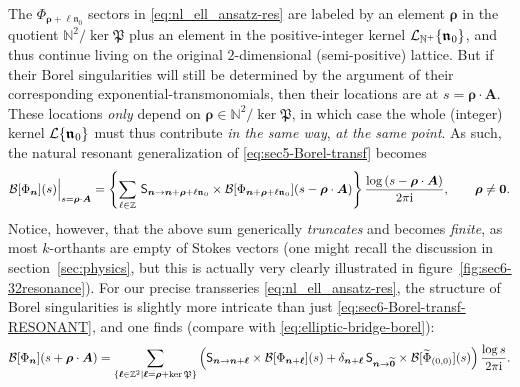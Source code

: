 \documentclass[11pt,a4paper]{article}
\newcommand{\CB}{{\cal B}}
\newcommand{\CL}{{\cal L}}
\def\BN{{\mathbb N}}
\def\BZ{{\mathbb Z}}
\newcommand{\be}{\begin{equation}}
\newcommand{\ee}{\end{equation}}
\newcommand{\nres}{\boldsymbol{\mathfrak{n}}_0}
\newcommand{\rmi}{{\mathrm{i}}}
\begin{document}
The $\Phi_{\boldsymbol{\rho} + \ell \nres}$ sectors in \eqref{eq:nl_ell_ansatz-res} are labeled by an element $\boldsymbol{\rho}$ in the quotient $\BN^2 / \ker \mathfrak{P}$ plus an element in the positive-integer kernel $\CL_{\BN^+} \{\nres\}$, and thus continue living on the original $2$-dimensional (semi-positive) lattice. But if their Borel singularities will still be determined by the argument of their corresponding exponential-transmonomials, then their locations are at $s = \boldsymbol{\rho} \cdot \boldsymbol{A}$. These locations \textit{only} depend on $\boldsymbol{\rho} \in \BN^2 / \ker \mathfrak{P}$, in which case the whole (integer) kernel $\CL \{\nres\}$ must thus contribute \textit{in the same way}, \textit{at the same point}. As such, the natural resonant generalization of \eqref{eq:sec5-Borel-transf} becomes
%
\begin{equation}
\label{eq:sec6-Borel-transf-RESONANT}
\CB [\Phi_{\boldsymbol{n}}] (s) \Big|_{s=\boldsymbol{\rho}\cdot\boldsymbol{A}} = \left\{ \sum_{\ell \in \BZ}\, \mathsf{S}_{\boldsymbol{n} \to \boldsymbol{n}+\boldsymbol{\rho}+\ell\nres} \times \CB [\Phi_{\boldsymbol{n}+\boldsymbol{\rho}+\ell\nres}] (s-\boldsymbol{\rho}\cdot\boldsymbol{A}) \right\} \frac{\log \left(s-\boldsymbol{\rho}\cdot\boldsymbol{A}\right)}{2\pi\rmi}, \qquad \boldsymbol{\rho} \neq \boldsymbol{0}.
\end{equation}
%
\noindent
Notice, however, that the above sum generically \textit{truncates} and becomes \textit{finite}, as most $k$-orthants are empty of Stokes vectors (one might recall the discussion in section~\ref{sec:physics}, but this is actually very clearly illustrated in figure~\ref{fig:sec6-32resonance}). For our precise transseries \eqref{eq:nl_ell_ansatz-res}, the structure of Borel singularities is slightly more intricate than just \eqref{eq:sec6-Borel-transf-RESONANT}, and one finds (compare with \eqref{eq:elliptic-bridge-borel}):
%
\be
\label{eq:elliptic-bridge-borel-res}
\CB [\Phi_{\boldsymbol{n}}] ( s + \boldsymbol{\rho} \cdot \boldsymbol{A} ) = \sum_{\{ \boldsymbol{\ell} \in \BZ^2 | \boldsymbol{\ell} = \boldsymbol{\rho} + \ker \mathfrak{P} \}} \left( \mathsf{S}_{\boldsymbol{n} \to \boldsymbol{n}+\boldsymbol{\ell}} \times \CB [ \Phi_{\boldsymbol{n}+\boldsymbol{\ell}} ] (s) + \delta_{\boldsymbol{n}+\boldsymbol{\ell}}\, \mathsf{S}_{\boldsymbol{n} \to \widetilde{\boldsymbol{0}}} \times \CB [\widetilde{\Phi}_{(0,0)}] (s) \right) \frac{\log s}{2\pi\mathrm{i}}.
\ee
\end{document}
